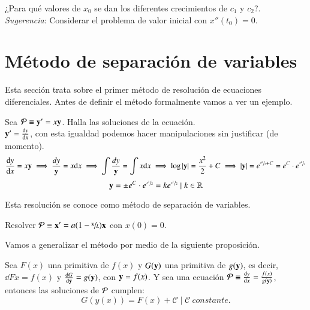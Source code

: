 \begin{th_ex}\label{thex:29/01-0}
    ¿Para qué valores de $x_0$ se dan los diferentes crecimientos de $c_1$ y $c_2$?.\\
    \textit{Sugerencia}: Considerar el problema de valor inicial con $x''(t_0) = 0$.
\end{th_ex}

\section{M\'{e}todo de separaci\'{o}n de variables}
Esta sección trata sobre el primer método de resolución de ecuaciones diferenciales. Antes de definir el método formalmente vamos a ver un ejemplo.
\begin{eg}
    Sea $\P \equiv \mbf{y'} = x\mbf{y}$. Halla las soluciones de la ecuación.\\
    $\mbf{y'} = \dd{y}{x}$, con esta igualdad podemos hacer manipulaciones sin justificar (de momento).
    $$
        \dd{y}{x} = x \mbf{y} \implies \frac{dy}{\mbf{y}} = x\d x \implies \int \frac{dy}{\mbf{y}} = \int x\d x \implies \log|\mbf{y}| = \frac{x^2}{2} + C \implies |\mbf{y}| = e^{\sfrac{x^2}{2} + C} = e^C \cdot e^{\sfrac{x^2}{2}}
    $$
    $$
        \mbf{y} = \pm e^C \cdot e^{\sfrac{x^2}{2}} = ke^{\sfrac{x^2}{2}} \mid k \in \R
    $$
\end{eg}
Esta resolución se conoce como método de separación de variables.
\begin{th_ex}\label{thex:29/01-1}
    Resolver $\P \equiv \mbf{x'} = a(1-\sfrac{\mbf{x}}{L})\mbf{x}$ con $x(0)=0$.\\
\end{th_ex}
Vamos a generalizar el método por medio de la siguiente proposición.
\begin{pro}
    Sea $F(x)$ una primitiva de $f(x)$ y $G(\mbf{y})$ una primitiva de $g(\mbf{y})$, es decir, $\dd{F}{x} = f(x)$ y $\dd{G}{\mbf{y}} = g(\mbf{y})$, con $\mbf{y} = f(x)$. Y sea una ecuación $\P \equiv \dd{y}{x} = \frac{f(x)}{g(\mbf{y})}$, entonces las soluciones de $\P$ cumplen:
    $$
        G(y(x)) = F(x) + \mathcal{C} \mid \mathcal{C}\ constante.
    $$
\end{pro}

